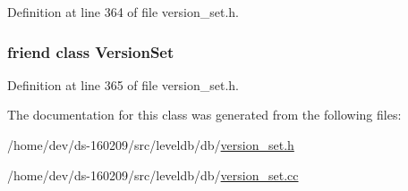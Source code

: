 Definition at line 364 of file version\+\_\+set.\+h.

\hypertarget{classleveldb_1_1_compaction_a1827cd1b4d6e9e3c378ce37ca3cce635}{}
\subsubsection[{Version\+Set}]{\setlength{\rightskip}{0pt plus 5cm}friend class {\bf Version\+Set}\hspace{0.3cm}{\ttfamily [friend]}}\label{classleveldb_1_1_compaction_a1827cd1b4d6e9e3c378ce37ca3cce635}


Definition at line 365 of file version\+\_\+set.\+h.



The documentation for this class was generated from the following files\+:\begin{DoxyCompactItemize}
\item 
/home/dev/ds-\/160209/src/leveldb/db/\hyperlink{version__set_8h}{version\+\_\+set.\+h}\item 
/home/dev/ds-\/160209/src/leveldb/db/\hyperlink{version__set_8cc}{version\+\_\+set.\+cc}\end{DoxyCompactItemize}

